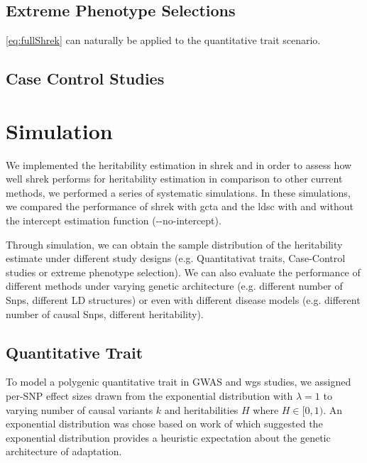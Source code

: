 \documentclass{book}
\begin{document}
		\subsection{Extreme Phenotype Selections}
		\cref{eq:fullShrek} can naturally be applied to the quantitative trait scenario. 
		\subsection{Case Control Studies}
	\section{Simulation}
		We implemented the heritability estimation in \gls{shrek} and in order to assess how well \gls{shrek} performs for heritability estimation in comparison to other current methods, we performed a series of systematic simulations.
		In these simulations, we compared the performance of \gls{shrek} with \gls{gcta}\citep{Yang2011} and the \gls{ldsc}\citep{Bulik-Sullivan2015} with and without the intercept estimation function (-{}-no-intercept). 
		
		Through simulation, we can obtain the sample distribution of the heritability estimate under different study designs (e.g. Quantitativat traits, Case-Control studies or extreme phenotype selection). 
		We can also evaluate the performance of different methods under varying genetic architecture (e.g. different number of Snps, different LD structures) or even with different disease models (e.g. different number of causal Snps, different heritability).
		
		\subsection{Quantitative Trait}
			To model a polygenic quantitative trait in \gls{GWAS} and \gls{wgs} studies, we assigned per-\gls{SNP} effect sizes drawn from the exponential distribution with $\lambda = 1$ to varying number of causal variants $k$ and heritabilities $H$ where $H\in[0,1)$. 
			An exponential distribution was chose based on work of \citet{Orr1998} which suggested the exponential distribution provides a heuristic expectation about the genetic architecture of adaptation.
			
\end{document}
